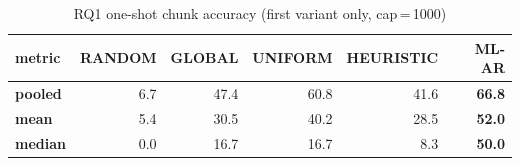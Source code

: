 \begin{table}[ht]
\centering
\caption{RQ1 one-shot chunk accuracy (first variant only, cap\,=\,1000)}
\label{tab:rq1-oneshot}
\begin{tabular}{l|rrrrr}
\hline
\textbf{metric} & \textbf{RANDOM} & \textbf{GLOBAL} & \textbf{UNIFORM} & \textbf{HEURISTIC} & \textbf{ML-AR} \\
\hline
\textbf{pooled} & 6.7 & 47.4 & 60.8 & 41.6 & \textbf{66.8} \\
\textbf{mean} & 5.4 & 30.5 & 40.2 & 28.5 & \textbf{52.0} \\
\textbf{median} & 0.0 & 16.7 & 16.7 & 8.3 & \textbf{50.0} \\
\hline
\end{tabular}
\end{table}
